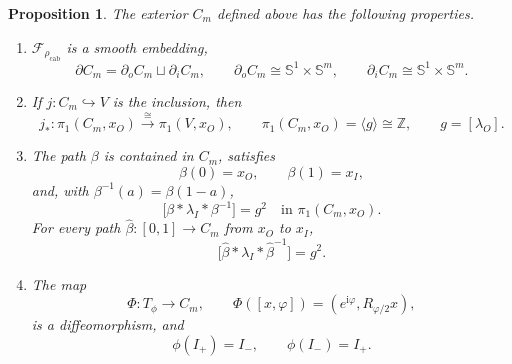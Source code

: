\documentclass[10pt,a4paper]{amsart}
\newtheorem{proposition}{Proposition}
\newcommand{\rhoCab}{{\rho_{\mathrm{cab}}}}
\begin{document}
\begin{proposition}
\label{prop:double-cable}
The exterior $C_m$ defined above has the following properties.
\begin{enumerate}[label=\textup{(\roman*)}]
\item $\mathcal F_{\rhoCab}$ is a smooth embedding,
\[
 \partial C_m=\partial_oC_m\sqcup\partial_iC_m,
 \qquad
 \partial_oC_m\cong\mathbb S^1\times\mathbb S^m,
 \qquad
 \partial_iC_m\cong\mathbb S^1\times\mathbb S^m.
\]
\item If $j:C_m\hookrightarrow V$ is the inclusion, then
\[
 j_*:\pi_1(C_m,x_O)\xrightarrow{\ \cong\ }\pi_1(V,x_O),
 \qquad
 \pi_1(C_m,x_O)=\langle g\rangle\cong\mathbb Z,
 \qquad
 g=[\lambda_O].
\]
\item The path $\beta$ is contained in $C_m$, satisfies
\[
 \beta(0)=x_O,
 \qquad
 \beta(1)=x_I,
\]
and, with $\beta^{-1}(a)=\beta(1-a)$,
\[
 \bigl[\beta*\lambda_I*\beta^{-1}\bigr]=g^2
 \quad\text{in }\pi_1(C_m,x_O).
\]
For every path $\widehat\beta:[0,1]\to C_m$ from $x_O$ to $x_I$,
\[
 \bigl[\widehat\beta*\lambda_I*\widehat\beta^{-1}\bigr]=g^2.
\]
\item The map
\[
 \Phi:T_\phi\longrightarrow C_m,
 \qquad
 \Phi([x,\varphi])=(e^{\mathrm i\varphi},R_{\varphi/2}x),
\]
is a diffeomorphism, and
\[
 \phi(I_+)=I_-,
 \qquad
 \phi(I_-)=I_+.
\]
\end{enumerate}
\end{proposition}
\end{document}
